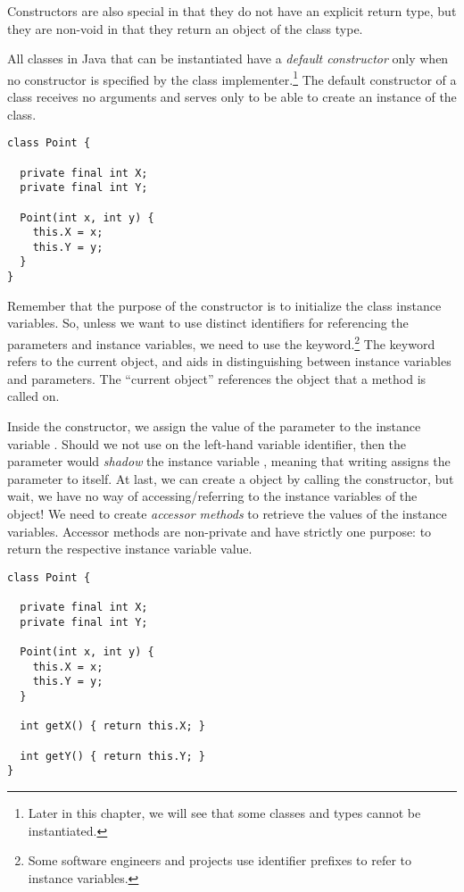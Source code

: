 Constructors are also special in that they do not have an explicit return type, but they are non-void in that they return an object of the class type.

All classes in Java that can be instantiated have a \emph{default constructor} only when no constructor is specified by the class implementer.\footnote{Later in this chapter, we will see that some classes and types cannot be instantiated.} 
The default constructor of a class receives no arguments and serves only to be able to create an instance of the class.

\begin{lstlisting}[language=MyJava]
class Point {
  
  private final int X;
  private final int Y;
  
  Point(int x, int y) {
    this.X = x;
    this.Y = y;
  }
}
\end{lstlisting}

Remember that the purpose of the  constructor is to initialize the class instance variables. 
So, unless we want to use distinct identifiers for referencing the parameters and instance variables, we need to use the  keyword.\footnote{Some software engineers and projects use identifier prefixes to refer to instance variables.} 
The  keyword refers to the current object, and aids in distinguishing between instance variables and parameters. 
The ``current object'' references the object that a method is called on. 

Inside the constructor, we assign the value of the parameter  to the instance variable . 
Should we not use  on the left-hand variable identifier, then the parameter  would \emph{shadow} the instance variable , meaning that writing  assigns the parameter to itself. 
At last, we can create a  object by calling the constructor, but wait, we have no way of accessing/referring to the instance variables of the  object! 
We need to create \emph{accessor methods} to retrieve the values of the instance variables. 
Accessor methods are non-private and have strictly one purpose: to return the respective instance variable value.

\begin{lstlisting}[language=MyJava]
class Point {

  private final int X;
  private final int Y;
  
  Point(int x, int y) {
    this.X = x;
    this.Y = y;
  }
  
  int getX() { return this.X; }
  
  int getY() { return this.Y; }
}
\end{lstlisting}

